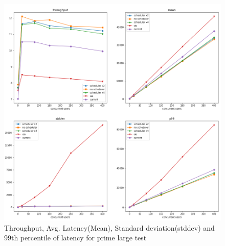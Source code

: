 \begin{figure}[htbp]
	\begin{center}
		\includegraphics[scale=0.5]{figures/prime_large test results.png}
	\end{center}
	\caption{Throughput, Avg. Latency(Mean), Standard deviation(stddev) and 99th percentile of latency for prime large test }
	\label{phase-1-prime-large-all-architectures}
\end{figure}

